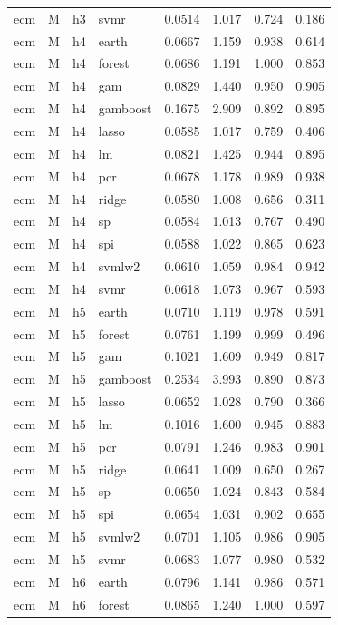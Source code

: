 \begin{ThreePartTable}
\begin{longtable}[t]{llclcccc}
ecm & M & h3 & svmr & 0.0514 & 1.017 & 0.724 & 0.186\\
\addlinespace
ecm & M & h4 & earth & 0.0667 & 1.159 & 0.938 & 0.614\\
ecm & M & h4 & forest & 0.0686 & 1.191 & 1.000 & 0.853\\
ecm & M & h4 & gam & 0.0829 & 1.440 & 0.950 & 0.905\\
ecm & M & h4 & gamboost & 0.1675 & 2.909 & 0.892 & 0.895\\
ecm & M & h4 & lasso & 0.0585 & 1.017 & 0.759 & 0.406\\
ecm & M & h4 & lm & 0.0821 & 1.425 & 0.944 & 0.895\\
ecm & M & h4 & pcr & 0.0678 & 1.178 & 0.989 & 0.938\\
ecm & M & h4 & ridge & 0.0580 & 1.008 & 0.656 & 0.311\\
ecm & M & h4 & sp & 0.0584 & 1.013 & 0.767 & 0.490\\
ecm & M & h4 & spi & 0.0588 & 1.022 & 0.865 & 0.623\\
ecm & M & h4 & svmlw2 & 0.0610 & 1.059 & 0.984 & 0.942\\
ecm & M & h4 & svmr & 0.0618 & 1.073 & 0.967 & 0.593\\
\addlinespace
ecm & M & h5 & earth & 0.0710 & 1.119 & 0.978 & 0.591\\
ecm & M & h5 & forest & 0.0761 & 1.199 & 0.999 & 0.496\\
ecm & M & h5 & gam & 0.1021 & 1.609 & 0.949 & 0.817\\
ecm & M & h5 & gamboost & 0.2534 & 3.993 & 0.890 & 0.873\\
ecm & M & h5 & lasso & 0.0652 & 1.028 & 0.790 & 0.366\\
ecm & M & h5 & lm & 0.1016 & 1.600 & 0.945 & 0.883\\
ecm & M & h5 & pcr & 0.0791 & 1.246 & 0.983 & 0.901\\
ecm & M & h5 & ridge & 0.0641 & 1.009 & 0.650 & 0.267\\
ecm & M & h5 & sp & 0.0650 & 1.024 & 0.843 & 0.584\\
ecm & M & h5 & spi & 0.0654 & 1.031 & 0.902 & 0.655\\
ecm & M & h5 & svmlw2 & 0.0701 & 1.105 & 0.986 & 0.905\\
ecm & M & h5 & svmr & 0.0683 & 1.077 & 0.980 & 0.532\\
\addlinespace
ecm & M & h6 & earth & 0.0796 & 1.141 & 0.986 & 0.571\\
ecm & M & h6 & forest & 0.0865 & 1.240 & 1.000 & 0.597\\

\end{longtable}
\end{ThreePartTable}
